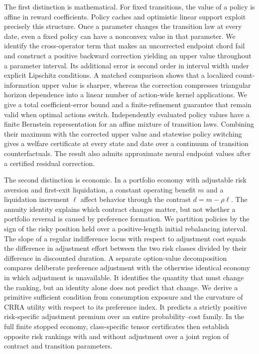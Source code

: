 The first distinction is mathematical. For fixed transitions, the value of a policy is affine in reward coefficients. Policy caches and optimistic linear support exploit precisely this structure. Once a parameter changes the transition law at every date, even a fixed policy can have a nonconvex value in that parameter. We identify the cross-operator term that makes an uncorrected endpoint chord fail and construct a positive backward correction yielding an upper value throughout a parameter interval. Its additional error is second order in interval width under explicit Lipschitz conditions. A matched comparison shows that a localized count-information upper value is sharper, whereas the correction compresses triangular horizon dependence into a linear number of action-wide kernel applications. We give a total coefficient-error bound and a finite-refinement guarantee that remain valid when optimal actions switch. Independently evaluated policy values have a finite Bernstein representation for an affine mixture of transition laws. Combining their maximum with the corrected upper value and statewise policy switching gives a welfare certificate at every state and date over a continuum of transition counterfactuals. The result also admits approximate neural endpoint values after a certified residual correction.

The second distinction is economic. In a portfolio economy with adjustable risk aversion and first-exit liquidation, a constant operating benefit $m$ and a liquidation increment $\ell$ affect behavior through the contrast $d=m-\rho\ell$. The annuity identity explains which contract changes matter, but not whether a portfolio reversal is caused by preference formation. We partition policies by the sign of the risky position held over a positive-length initial rebalancing interval. The slope of a regular indifference locus with respect to adjustment cost equals the difference in adjustment effort between the two risk classes divided by their difference in discounted duration. A separate option-value decomposition compares deliberate preference adjustment with the otherwise identical economy in which adjustment is unavailable. It identifies the quantity that must change the ranking, but an identity alone does not predict that change. We derive a primitive sufficient condition from consumption exposure and the curvature of CRRA utility with respect to its preference index. It predicts a strictly positive risk-specific adjustment premium over an entire probability--cost family. In the full finite stopped economy, class-specific tensor certificates then establish opposite risk rankings with and without adjustment over a joint region of contract and transition parameters.

